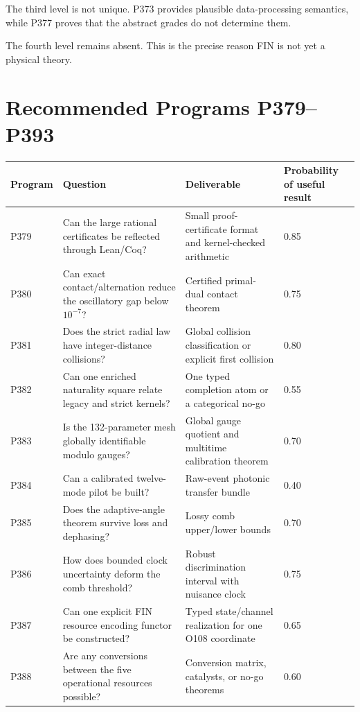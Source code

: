 \documentclass[11pt,a4paper,openany]{report}
\begin{document}
The third level is not unique. P373 provides plausible data-processing semantics, while P377 proves that the abstract grades do not determine them.

The fourth level remains absent. This is the precise reason FIN is not yet a physical theory.

\chapter{Recommended Programs P379--P393}

\begin{center}
\begingroup\small
\setlength{\tabcolsep}{2.5pt}
\renewcommand{\arraystretch}{1.16}
\begin{longtable}{@{}p{}p{}p{}p{}@{}}
\toprule
\textbf{Program} & \textbf{Question} & \textbf{Deliverable} & \textbf{Probability of useful result} \\
\midrule
\endhead
P379 & Can the large rational certificates be reflected through Lean/\allowbreak{}Coq? & Small proof-certificate format and kernel-checked arithmetic & 0.85 \\
P380 & Can exact contact/\allowbreak{}alternation reduce the oscillatory gap below \(10^{-7}\)? & Certified primal-dual contact theorem & 0.75 \\
P381 & Does the strict radial law have integer-distance collisions? & Global collision classification or explicit first collision & 0.80 \\
P382 & Can one enriched naturality square relate legacy and strict kernels? & One typed completion atom or a categorical no-go & 0.55 \\
P383 & Is the 132-parameter mesh globally identifiable modulo gauges? & Global gauge quotient and multitime calibration theorem & 0.70 \\
P384 & Can a calibrated twelve-mode pilot be built? & Raw-event photonic transfer bundle & 0.40 \\
P385 & Does the adaptive-angle theorem survive loss and dephasing? & Lossy comb upper/\allowbreak{}lower bounds & 0.70 \\
P386 & How does bounded clock uncertainty deform the comb threshold? & Robust discrimination interval with nuisance clock & 0.75 \\
P387 & Can one explicit FIN resource encoding functor be constructed? & Typed state/\allowbreak{}channel realization for one O108 coordinate & 0.65 \\
P388 & Are any conversions between the five operational resources possible? & Conversion matrix, catalysts, or no-go theorems & 0.60 \\

\end{longtable}
\end{center}
\end{document}
